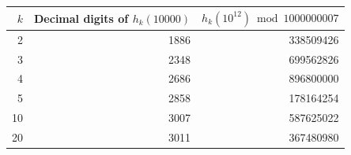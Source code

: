\begin{center}
\begin{tabular}{@{}rrr@{}}
\toprule
$k$ & Decimal digits of $h_k(10000)$ & $h_k(10^{12})\bmod 1000000007$\\
\midrule
2 & 1886 & 338509426\\
3 & 2348 & 699562826\\
4 & 2686 & 896800000\\
5 & 2858 & 178164254\\
10 & 3007 & 587625022\\
20 & 3011 & 367480980\\
\bottomrule
\end{tabular}
\end{center}
